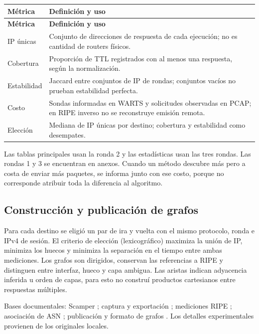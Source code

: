 \begingroup
\fontsize{9}{11}\selectfont
\addtocounter{table}{-1}
\begin{longtable}{p{3cm}p{11.3cm}}
\toprule
\textbf{Métrica} & \textbf{Definición y uso} \\ \midrule
\endfirsthead
\toprule
\textbf{Métrica} & \textbf{Definición y uso} \\ \midrule
\endhead
IP únicas & Conjunto de direcciones de respuesta de cada ejecución; no es cantidad de routers físicos. \\
Cobertura & Proporción de TTL registrados con al menos una respuesta, según la normalización. \\
Estabilidad & Jaccard entre conjuntos de IP de rondas; conjuntos vacíos no prueban estabilidad perfecta. \\
Costo & Sondas informadas en WARTS y solicitudes observadas en PCAP; en RIPE inverso no se reconstruye emisión remota. \\
Elección & Mediana de IP únicas por destino; cobertura y estabilidad como desempates. \\
\bottomrule
\end{longtable}
\endgroup


Las tablas principales usan la ronda 2 y las estadísticas usan las tres rondas. Las rondas 1 y 3 se encuentran en anexos. Cuando un método descubre más pero a costa de enviar más paquetes, se informa junto con ese costo, porque no corresponde atribuir toda la diferencia al algoritmo.


\subsection{Construcción y publicación de grafos}

Para cada destino se eligió un par de ira y vuelta con el mismo protocolo, ronda e IPv4 de sesión. El criterio de elección (lexicográfico) maximiza la unión de IP, minimiza los huecos y minimiza la separación en el tiempo entre ambas mediciones. Los grafos son dirigidos, conservan las referencias a RIPE y distinguen entre interfaz, hueco y capa ambigua. Las aristas indican adyacencia inferida u orden de capas, para esto no construí productos cartesianos entre respuestas múltiples. 


\noindent Bases documentales: Scamper \cite{ref1}; captura y exportación \cite{ref2}; mediciones RIPE \cite{ref3}; asociación de ASN \cite{ref4}; publicación y formato de grafos \cite{ref5,ref6}. Los detalles experimentales provienen de los originales locales.
